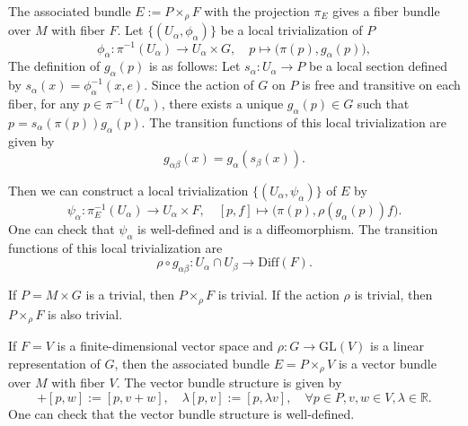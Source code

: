 \begin{fact}
    The associated bundle $E:=P\times_\rho F$ with the projection $\pi_E$ gives a fiber bundle over $M$ with fiber $F$.
    Let $\{(U_\alpha, \phi_\alpha)\}$ be a local trivialization of $P$ 
    \begin{equation*}
        \phi_\alpha: \pi^{-1}(U_\alpha) \to U_\alpha\times G, \quad p\mapsto \Big(\pi(p), g_\alpha(p)\Big),
    \end{equation*}
    The definition of $g_\alpha(p)$ is as follows: 
    Let $s_\alpha: U_\alpha\to P$ be a local section defined by $s_\alpha(x) = \phi_\alpha^{-1}(x, e)$. 
    Since the action of $G$ on $P$ is free and transitive on each fiber, for any $p\in \pi^{-1}(U_\alpha)$, 
    there exists a unique $g_\alpha(p)\in G$ such that $p=s_\alpha(\pi(p))g_\alpha(p)$. 
    The transition functions of this local trivialization are given by 
    \begin{equation*}
        g_{\alpha\beta}(x) = g_\alpha(s_\beta(x)).
    \end{equation*}

    Then we can construct a local trivialization $\{(U_\alpha, \psi_\alpha)\}$ of $E$ by 
    \begin{equation*}
        \psi_\alpha: \pi_E^{-1}(U_\alpha) \to U_\alpha\times F, \quad [p, f]\mapsto \Big(\pi(p), \rho(g_\alpha(p))f\Big).
    \end{equation*}
    One can check that $\psi_\alpha$ is well-defined and is a diffeomorphism. 
    The transition functions of this local trivialization are 
    \begin{equation*}
        \rho\circ g_{\alpha\beta}: U_\alpha\cap U_\beta\to \mathrm{Diff}(F).
    \end{equation*}
\end{fact}
\begin{example}
    If $P=M\times G$ is a trivial, then $P\times_\rho F$ is trivial. 
    If the action $\rho$ is trivial, then $P\times_\rho F$ is also trivial.
\end{example}
\begin{example}
    If $F=V$ is a finite-dimensional vector space and $\rho:G\to \mathrm{GL}(V)$ is a linear representation of $G$, 
    then the associated bundle $E=P\times_\rho V$ is a vector bundle over $M$ with fiber $V$. The vector bundle structure is given by
    \begin{equation*}
        [p, v]+[p, w] := [p, v+w], \quad \lambda[p, v] := [p, \lambda v], \quad \forall p\in P, v,w\in V, \lambda\in\mathbb{R}.
    \end{equation*}
    One can check that the vector bundle structure is well-defined.
\end{example}
